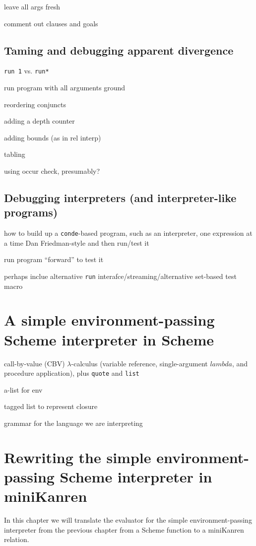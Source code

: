 \documentclass{book}
\begin{document}
leave all args fresh

comment out clauses and goals

\section{Taming and debugging apparent divergence}

\verb|run 1| vs. \verb|run*|

run program with all arguments ground

reordering conjuncts

adding a depth counter

adding bounds (as in rel interp)

tabling

using occur check, presumably?

\section{Debugging interpreters (and interpreter-like programs)}

how to build up a \verb|conde|-based program, such as an interpreter, one expression at a time Dan Friedman-style and then run/test it

run program ``forward'' to test it

perhaps inclue alternative \verb|run| interafce/streaming/alternative set-based test macro


\chapter{A simple environment-passing Scheme interpreter in Scheme}%

call-by-value (CBV) $\lambda$-calculus (variable reference, single-argument $lambda$, and procedure application), plus \verb|quote| and \verb|list|

a-list for env

tagged list to represent closure

grammar for the language we are interpreting


\chapter{Rewriting the simple environment-passing Scheme interpreter in miniKanren}%

In this chapter we will translate the evaluator for the simple environment-passing interpreter from the previous chapter from a Scheme function to a miniKanren relation.
\end{document}
